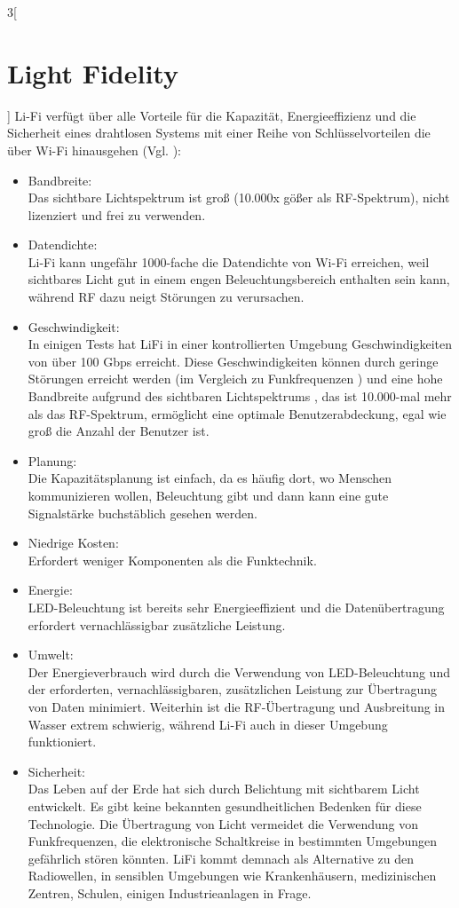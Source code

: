 \begin{multicols}{3}[\section{Light Fidelity}]
Li-Fi verfügt über alle Vorteile für die Kapazität, Energieeffizienz und die Sicherheit eines drahtlosen Systems mit einer Reihe von Schlüsselvorteilen die über Wi-Fi hinausgehen (Vgl. \cite{lifi.1}): \\
\begin{itemize}
	\item Bandbreite: \\
		Das sichtbare Lichtspektrum ist groß (10.000x gößer als RF-Spektrum), nicht lizenziert und frei zu verwenden.
	\item Datendichte: \\
		Li-Fi kann ungefähr 1000-fache die Datendichte von Wi-Fi erreichen, weil sichtbares Licht gut in einem engen Beleuchtungsbereich enthalten sein kann, während RF dazu neigt Störungen zu verursachen.
	\item Geschwindigkeit: \\
		In einigen Tests hat LiFi in einer kontrollierten Umgebung Geschwindigkeiten von über 100 Gbps erreicht. Diese 			 	Geschwindigkeiten können durch geringe Störungen erreicht werden (im Vergleich zu Funkfrequenzen ) und eine 				hohe Bandbreite aufgrund des sichtbaren Lichtspektrums , das ist 10.000-mal mehr als das RF-Spektrum, ermöglicht 		eine optimale Benutzerabdeckung, egal wie groß die Anzahl der Benutzer ist.
	\item Planung: \\
		Die Kapazitätsplanung ist einfach, da es häufig dort, wo Menschen kommunizieren wollen, Beleuchtung gibt und 				dann kann eine gute Signalstärke buchstäblich gesehen werden.
	\item Niedrige Kosten:\\
		Erfordert weniger Komponenten als die Funktechnik.
	\item Energie:\\
		LED-Beleuchtung ist bereits sehr Energieeffizient und die Datenübertragung erfordert vernachlässigbar zusätzliche Leistung.
	\item Umwelt:\\
		Der Energieverbrauch  wird durch die Verwendung von LED-Beleuchtung und der erforderten, vernachlässigbaren, zusätzlichen Leistung zur Übertragung von Daten minimiert. Weiterhin ist die RF-Übertragung und Ausbreitung in Wasser extrem schwierig, während Li-Fi auch in dieser Umgebung funktioniert.
	\item Sicherheit:\\
		 Das Leben auf der Erde hat sich durch Belichtung mit sichtbarem Licht entwickelt. Es gibt keine bekannten gesundheitlichen Bedenken für diese Technologie. Die Übertragung von Licht vermeidet die Verwendung von Funkfrequenzen, die elektronische Schaltkreise in bestimmten Umgebungen gefährlich stören könnten. LiFi kommt demnach als Alternative zu den Radiowellen, in sensiblen Umgebungen wie Krankenhäusern, medizinischen Zentren, Schulen, einigen Industrieanlagen in Frage.	

\end{itemize}
\end{multicols}
